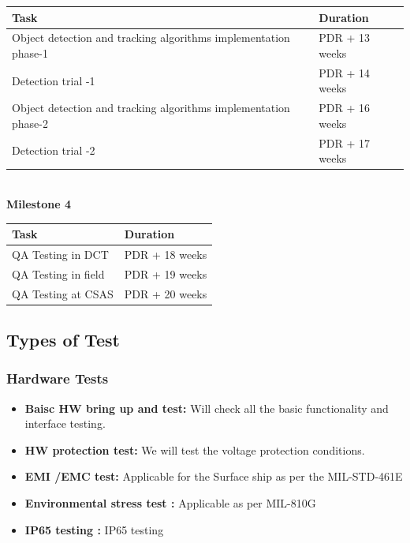 \documentclass[a4paper,12pt]{article}
\begin{document}
	\noindent
	\begin{tabular}{|l|l|}
		\hline
		\textbf{Task} & \textbf{Duration} \\
		\hline
		Object detection and tracking algorithms implementation phase-1 & PDR + 13 weeks \\
		\hline
		Detection trial -1 & PDR + 14 weeks \\
		\hline
		Object detection and tracking algorithms implementation phase-2 & PDR + 16 weeks \\
		\hline
		Detection trial -2 & PDR + 17 weeks \\
		\hline
	\end{tabular}
	\\
	\newline
	\noindent
	\textbf{Milestone 4}\\
	
\noindent
\begin{tabular}{|l|l|}
	\hline
	\textbf{Task} & \textbf{Duration} \\
	\hline
	QA Testing in DCT & PDR + 18 weeks \\
	\hline
	QA Testing in field & PDR + 19 weeks \\
	\hline
	QA Testing at CSAS & PDR + 20 weeks \\
	\hline
\end{tabular}

	\newpage
	\subsection{Types of Test}
	
	\subsubsection{Hardware Tests}
	
	\begin{itemize}
		\item \textbf{Baisc HW bring up and test: }
		Will check all the basic functionality and interface testing.
		\item \textbf{HW protection test:}
		We will test the voltage protection conditions. 
		\item \textbf{EMI /EMC test: }
		Applicable for the Surface ship as per the MIL-STD-461E 
		\item \textbf{Environmental stress test : }
		Applicable as per MIL-810G 
		\item \textbf{IP65 testing : }
		IP65 testing
	\end{itemize}
	
\end{document}
